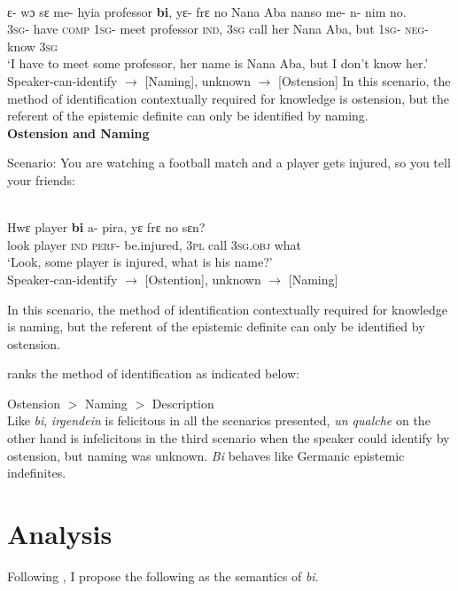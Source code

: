 \documentclass[output=paper,modfonts,nonflat,draftmode]{langsci/langscibook}
\begin{document}
\ea\label{owusu:ex45b}\\
\gll ε- wɔ  sε me- hyia professor \textbf{bi}, yε- frε no Nana Aba nanso me- n- nim no.\\
\textsc{3sg}- have \textsc{comp} \textsc{1sg}- meet professor \textsc{ind}, \textsc{3sg} call her Nana Aba, but \textsc{1sg}- \textsc{neg}- know \textsc{3sg}\\
\glt `I have to meet some professor, her name is Nana Aba, but I don't know her.'\\
	Speaker-can-identify $\rightarrow$ [Naming], unknown $\rightarrow$  [Ostension]
 \z In this scenario, the method of identification contextually required for knowledge is ostension, but the referent of the epistemic definite can only be identified by naming. \\

\textbf{Ostension and Naming}

 Scenario: You are watching a football match and a player gets injured, so you tell your friends:

 \ea\label{owusu:ex45c}\\
\gll Hwε player \textbf{bi} a- pira, yε frε no sεn?\\
look player  \textsc{ind} \textsc{perf}- be.injured, \textsc{3pl} call \textsc{3sg}.\textsc{obj} what\\
\glt `Look, some player is injured, what is his name?'\\
	Speaker-can-identify $\rightarrow$ [Ostention], unknown $\rightarrow$  [Naming]

 \z In this scenario, the method of identification contextually required for knowledge is naming, but the referent of the epistemic definite can only be identified by ostension.
 
 \citet{Aloni2001} ranks the method of identification as indicated below:
 
 Ostension $>$ Naming $>$ Description\\
 
Like \emph{bi}, \emph{irgendein} is felicitous in all the scenarios presented, \emph{un qualche} on the other hand is infelicitous in the third scenario when the speaker could identify by ostension, but naming was unknown. \emph{Bi} behaves like Germanic epistemic indefinites.

\section{Analysis}\label{sec:owusu:4}
Following \citet{Ionin2013}, I propose the following as the semantics of \emph{bi}.
\end{document}
